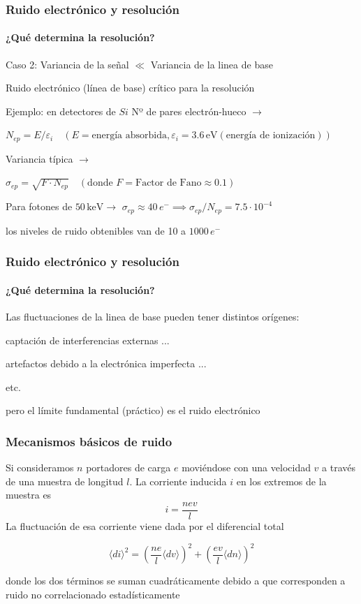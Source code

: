 \documentclass{beamer}
\begin{document}
\begin{frame}
\frametitle{Ruido electrónico y resolución}
\framesubtitle{¿Qué determina la resolución?}
{\color{blue}Caso 2: Variancia de la señal $\ll$ Variancia de la linea de base} 
\begin{alertblock}{}
Ruido electrónico (línea de base) crítico para la resolución
\end{alertblock}
\begin{block}{Ejemplo: \footnotesize{en detectores de $Si$}}
Nº de pares electrón-hueco $\rightarrow$
\begin{center}
$N_{ep} = E/\varepsilon_i \quad (E = \text{energía absorbida,}\, \varepsilon_i = 3.6\,\text{eV} (\text{energía de ionización}))$ 
\end{center}

Variancia típica $\rightarrow$ 
\begin{center}
$\sigma_{ep} = \sqrt{F\cdot N_{ep}} \quad (\text{donde} \,\, F = \text{Factor de Fano} \approx 0.1)$
\end{center}

Para fotones de $50\,\text{keV} \rightarrow$
$\sigma_{ep} \approx 40\,e^- \implies
\sigma_{ep}/N_{ep} = 7.5\cdot10^{-4}$

\vspace{2mm}
\alert{los niveles de ruido obtenibles van de 10 a $1000\,e^-$}
\end{block}
\end{frame} 

\begin{frame}
\frametitle{Ruido electrónico y resolución}
\framesubtitle{¿Qué determina la resolución?}
\begin{block}{}
Las fluctuaciones de la linea de base pueden tener distintos orígenes:

captación de interferencias externas ...

artefactos debido a la electrónica imperfecta ...

etc.

\alert{pero el límite fundamental (práctico) es el {\color{blue}ruido
electrónico}}
\end{block}
\end{frame} 

\begin{frame}
\frametitle{Mecanismos básicos de ruido}
\begin{block}{}
Si consideramos $n$ portadores de carga $e$ moviéndose
con una velocidad $v$ a través de una muestra de longitud
$l$. La corriente inducida $i$ en los extremos de la muestra es
$$i = \frac{nev}{l}$$
La fluctuación de esa corriente viene dada por el diferencial total

$$\langle di \rangle^2 = \left(\frac{ne}{l}\langle dv \rangle \right)^2 +
\left(\frac{ev}{l}\langle dn \rangle \right)^2 $$

donde los dos términos \alert{se suman cuadráticamente debido a que corresponden a ruido
no correlacionado estadísticamente}
\end{block}
\end{frame} 
\end{document}
